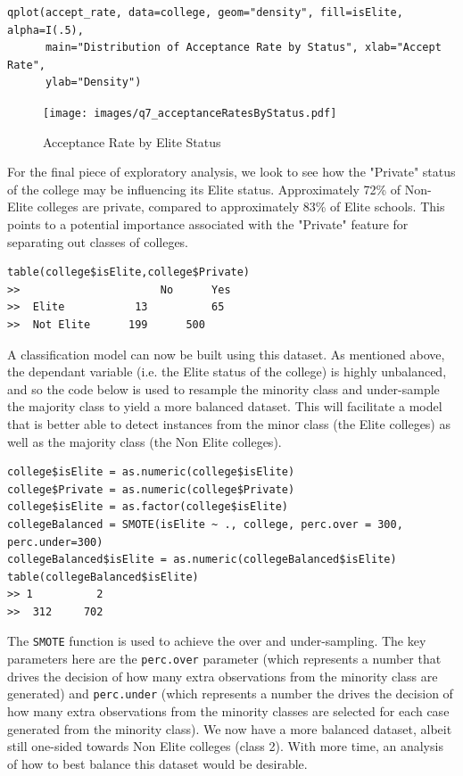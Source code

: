 \documentclass[paper=a4, fontsize=11pt]{scrartcl} %
\begin{document}
{{\begin{lstlisting}
qplot(accept_rate, data=college, geom="density", fill=isElite, alpha=I(.5), 
      main="Distribution of Acceptance Rate by Status", xlab="Accept Rate", 
      ylab="Density")
\end{lstlisting}
\begin{figure}[h]
\centering
\texttt{[image: images/q7\_acceptanceRatesByStatus.pdf]}
\caption{Acceptance Rate by Elite Status} 
\label{Acceptance_Rate_by_Elite_Status}
\end{figure}}
{\par For the final piece of exploratory analysis, we look to see how the "Private" status of the college may be influencing its Elite status. Approximately 72\% of Non-Elite colleges are private, compared to approximately 83\% of Elite schools. This points to a potential importance associated with the "Private" feature for separating out classes of colleges. 
\begin{lstlisting}
table(college$isElite,college$Private)
>>						No 		Yes
>>	Elite     	 	13  		65
>>	Not Elite      199		500
\end{lstlisting}}
{\par A classification model can now be built using this dataset. As mentioned above, the dependant variable (i.e. the Elite status of the college) is highly unbalanced, and so the code below is used to resample the minority class and under-sample the majority class to yield a more balanced dataset. This will facilitate a model that is better able to detect instances from the minor class (the Elite colleges) as well as the majority class (the Non Elite colleges). 
\begin{lstlisting}
college$isElite = as.numeric(college$isElite)
college$Private = as.numeric(college$Private)
college$isElite = as.factor(college$isElite)
collegeBalanced = SMOTE(isElite ~ ., college, perc.over = 300, perc.under=300)
collegeBalanced$isElite = as.numeric(collegeBalanced$isElite)
table(collegeBalanced$isElite)
>> 1		  2 
>>	312 	702
\end{lstlisting}}
{\par The \texttt{SMOTE} function is used to achieve the over and under-sampling. The key parameters here are the \texttt{perc.over} parameter (which represents a number that drives the decision of how many extra observations from the minority class are generated) and \texttt{perc.under} (which represents a number the drives the decision of how many extra observations from the minority classes are selected for each case generated from the minority class). We now have a more balanced dataset, albeit still one-sided towards Non Elite colleges (class 2). With more time, an analysis of how to best balance this dataset would be desirable.}
}
\end{document}
